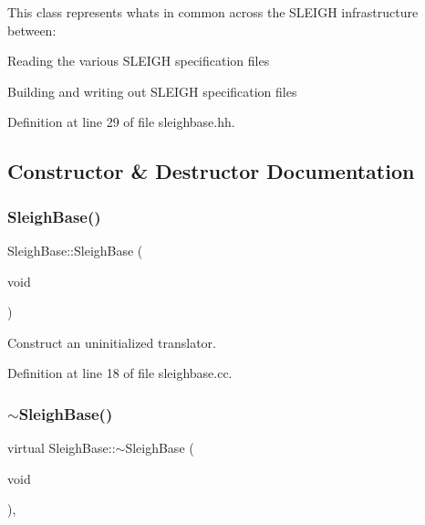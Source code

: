 This class represents what\textquotesingle{}s in common across the S\+L\+E\+I\+GH infrastructure between\+:
\begin{DoxyItemize}
\item Reading the various S\+L\+E\+I\+GH specification files
\item Building and writing out S\+L\+E\+I\+GH specification files 
\end{DoxyItemize}

Definition at line 29 of file sleighbase.\+hh.



\subsection{Constructor \& Destructor Documentation}
\mbox{\label{class_sleigh_base_af8e1d433a766cd09a21ad106f6428b11}} 
\subsubsection{\texorpdfstring{SleighBase()}{SleighBase()}}
{\footnotesize\ttfamily Sleigh\+Base\+::\+Sleigh\+Base (\begin{DoxyParamCaption}\item[{void}]{ }\end{DoxyParamCaption})}



Construct an uninitialized translator. 



Definition at line 18 of file sleighbase.\+cc.

\mbox{\label{class_sleigh_base_a61f8edca04aa8f77e8d3d8e18ca95e2c}} 
\subsubsection{\texorpdfstring{$\sim$SleighBase()}{~SleighBase()}}
{\footnotesize\ttfamily virtual Sleigh\+Base\+::$\sim$\+Sleigh\+Base (\begin{DoxyParamCaption}\item[{void}]{ }\end{DoxyParamCaption})\hspace{0.3cm}{\ttfamily [inline]}, {\ttfamily [virtual]}}



